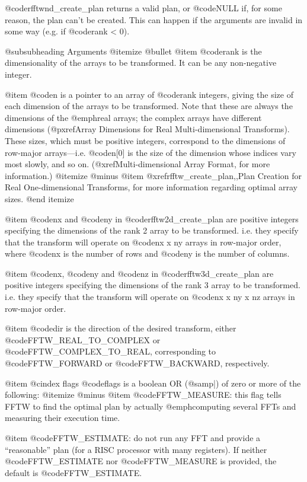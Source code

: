 @code{rfftwnd_create_plan} returns a valid plan, or @code{NULL} if, for
some reason, the plan can't be created.  This can happen if the
arguments are invalid in some way (e.g. if @code{rank} < 0).

@subsubheading Arguments
@itemize @bullet
@item
@code{rank} is the dimensionality of the arrays to be transformed.  It
can be any non-negative integer.

@item
@code{n} is a pointer to an array of @code{rank} integers, giving the
size of each dimension of the arrays to be transformed.  Note that these
are always the dimensions of the @emph{real} arrays; the complex arrays
have different dimensions (@pxref{Array Dimensions for Real
Multi-dimensional Transforms}).  These sizes, which must be positive
integers, correspond to the dimensions of row-major
arrays---i.e. @code{n[0]} is the size of the dimension whose indices
vary most slowly, and so on. (@xref{Multi-dimensional Array Format}, for
more information.)
@itemize @minus
@item
@xref{rfftw_create_plan,,Plan Creation for Real One-dimensional Transforms},
for more information regarding optimal array sizes.
@end itemize

@item
@code{nx} and @code{ny} in @code{rfftw2d_create_plan} are positive
integers specifying the dimensions of the rank 2 array to be
transformed. i.e. they specify that the transform will operate on
@code{nx x ny} arrays in row-major order, where @code{nx} is the number
of rows and @code{ny} is the number of columns.

@item
@code{nx}, @code{ny} and @code{nz} in @code{rfftw3d_create_plan} are
positive integers specifying the dimensions of the rank 3 array to be
transformed. i.e. they specify that the transform will operate on
@code{nx x ny x nz} arrays in row-major order.

@item
@code{dir} is the direction of the desired transform, either
@code{FFTW_REAL_TO_COMPLEX} or @code{FFTW_COMPLEX_TO_REAL},
corresponding to @code{FFTW_FORWARD} or @code{FFTW_BACKWARD},
respectively.

@item
@cindex flags
@code{flags} is a boolean OR (@samp{|}) of zero or more of the following:
@itemize @minus
@item
@code{FFTW_MEASURE}: this flag tells FFTW to find the optimal plan by
actually @emph{computing} several FFTs and measuring their execution
time.

@item
@code{FFTW_ESTIMATE}: do not run any FFT and provide a ``reasonable''
plan (for a RISC processor with many registers).  If neither
@code{FFTW_ESTIMATE} nor @code{FFTW_MEASURE} is provided, the default is
@code{FFTW_ESTIMATE}.

